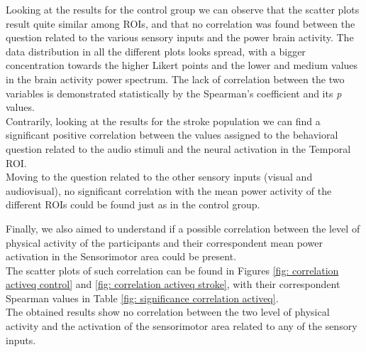 Looking at the results for the control group we can observe that the scatter plots result quite similar among ROIs, and that no correlation was found between the question related to the various sensory inputs and the power brain activity. The data distribution in all the different plots looks spread, with a bigger concentration towards the higher Likert points and the lower and medium values in the brain activity power spectrum. The lack of correlation between the two variables is demonstrated statistically by the Spearman's coefficient and its \textit{p} values. \\
Contrarily, looking at the results for the stroke population we can find a significant positive correlation between the values assigned to the behavioral question related to the audio stimuli and the neural activation in the Temporal ROI. \\
Moving to the question related to the other sensory inputs (visual and audiovisual), no significant correlation with the mean power activity of the different ROIs could be found just as in the control group.

Finally, we also aimed to understand if a possible correlation between the level of physical activity of the participants and their correspondent mean power activation in the Sensorimotor area could be present. \\
The scatter plots of such correlation can be found in Figures \ref{fig: correlation activeq control} and \ref{fig: correlation activeq stroke}, with their correspondent Spearman values in Table \ref{fig: significance correlation activeq}. \\
The obtained results show no correlation between the two level of physical activity and the activation of the sensorimotor area related to any of the sensory inputs. 

